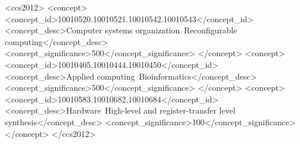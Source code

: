 \documentclass[sigconf]{acmart}
\begin{document}
\begin{CCSXML}
<ccs2012>
   <concept>
       <concept_id>10010520.10010521.10010542.10010543</concept_id>
       <concept_desc>Computer systems organization~Reconfigurable computing</concept_desc>
       <concept_significance>500</concept_significance>
       </concept>
    <concept>
       <concept_id>10010405.10010444.10010450</concept_id>
       <concept_desc>Applied computing~Bioinformatics</concept_desc>
       <concept_significance>500</concept_significance>
       </concept>
   <concept>
       <concept_id>10010583.10010682.10010684</concept_id>
       <concept_desc>Hardware~High-level and register-transfer level synthesis</concept_desc>
       <concept_significance>100</concept_significance>
       </concept>
 </ccs2012>
\end{CCSXML}



\maketitle
\acresetall







\end{document}
